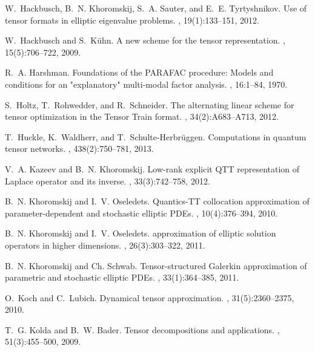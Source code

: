 \documentclass[11pt, a4paper]{article}
\begin{document}
\begin{thebibliography}{10}
W.~Hackbusch, B.~N. Khoromskij, S.~A. Sauter, and E.~E. Tyrtyshnikov.
\newblock Use of tensor formats in elliptic eigenvalue problems.
, 19(1):133--151, 2012.

W.~Hackbusch and S.~K{\"u}hn.
\newblock A new scheme for the tensor representation.
, 15(5):706--722, 2009.

R.~A. Harshman.
\newblock Foundations of the {PARAFAC} procedure: Models and conditions for an
  "explanatory" multi-modal factor analysis.
, 16:1--84, 1970.

S.~Holtz, T.~Rohwedder, and R.~Schneider.
\newblock The alternating linear scheme for tensor optimization in the {T}ensor
  {T}rain format.
, 34(2):A683--A713, 2012.

T.~Huckle, K.~Waldherr, and T.~Schulte-Herbr{\"u}ggen.
\newblock Computations in quantum tensor networks.
, 438(2):750--781, 2013.

V.~A. Kazeev and B.~N. Khoromskij.
\newblock Low-rank explicit {QTT} representation of {Laplace} operator and its
  inverse.
, 33(3):742--758, 2012.

B.~N. Khoromskij and I.~V. Oseledets.
\newblock Quantics-{TT} collocation approximation of parameter-dependent and
  stochastic elliptic {PDEs}.
, 10(4):376--394, 2010.

B.~N. Khoromskij and I.~V. Oseledets.
 approximation of elliptic solution operators in higher
  dimensions.
, 26(3):303--322, 2011.

B.~N. Khoromskij and Ch. Schwab.
\newblock Tensor-structured {G}alerkin approximation of parametric and
  stochastic elliptic {PDEs}.
, 33(1):364--385, 2011.

O.~Koch and C.~Lubich.
\newblock Dynamical tensor approximation.
, 31(5):2360--2375, 2010.

T.~G. Kolda and B.~W. Bader.
\newblock Tensor decompositions and applications.
, 51(3):455--500, 2009.


\end{thebibliography}
\end{document}
